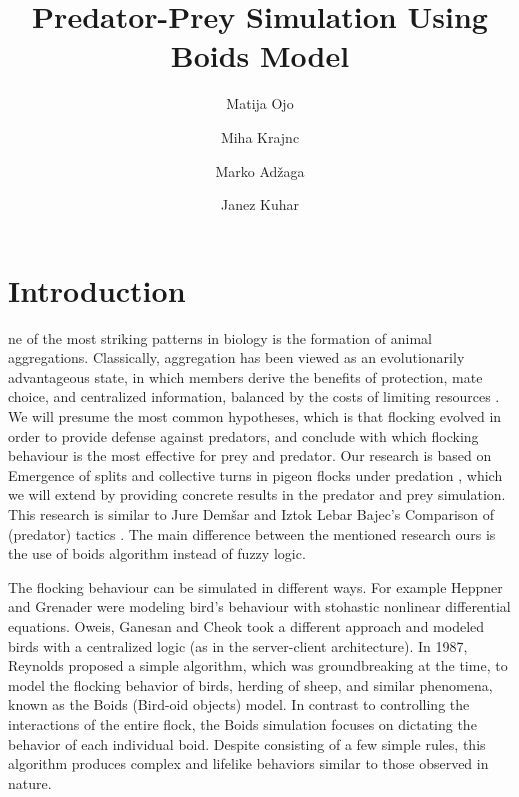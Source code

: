 \documentclass[9pt]{pnas-new}
\title{Predator-Prey Simulation Using Boids Model}
\author{Matija Ojo}
\author{Miha Krajnc}
\author{Marko Adžaga}
\author{Janez Kuhar}
\affil{Collective behaviour course research seminar report}
\begin{document}
\verticaladjustment{-2pt}

\maketitle
\thispagestyle{firststyle}

\section*{Introduction}

ne of the most striking patterns in biology is the formation of animal aggregations.
Classically, aggregation has been viewed as an evolutionarily advantageous state, in which members derive the benefits of protection, mate choice, and centralized information, balanced by the costs of limiting resources \cite{complexity_pattern}.
We will presume the most common hypotheses, which is that flocking evolved in order to provide defense against predators, and conclude with which flocking behaviour is the most effective for prey and predator.
Our research is based on Emergence of splits and collective turns in pigeon flocks under predation \cite{papadopoulou2022emergence}, which we will extend by providing concrete results in the predator and prey simulation.
This research is similar to Jure Demšar and Iztok Lebar Bajec's Comparison of (predator) tactics \cite{JDemsar_predator_attacks}.
The main difference between the mentioned research ours is the use of boids algorithm instead of fuzzy logic.

The flocking behaviour can be simulated in different ways.
For example Heppner and Grenader \cite{Heppner_nonlinear_model} were modeling bird's behaviour with stohastic nonlinear differential equations.
Oweis, Ganesan and Cheok \cite{centralized_flocking} took a different approach and modeled birds with a centralized logic (as in the server-client architecture).
In 1987, Reynolds \cite{reynolds1987flocks} proposed a simple algorithm, which was groundbreaking at the time, to model the
flocking behavior of birds, herding of sheep, and similar phenomena, known as the Boids (Bird-oid objects) model.
In contrast to controlling the interactions of the entire flock, the Boids simulation focuses on
dictating the behavior of each individual boid. Despite consisting of a few simple rules, this
algorithm produces complex and lifelike behaviors similar to those observed in nature.
\end{document}
